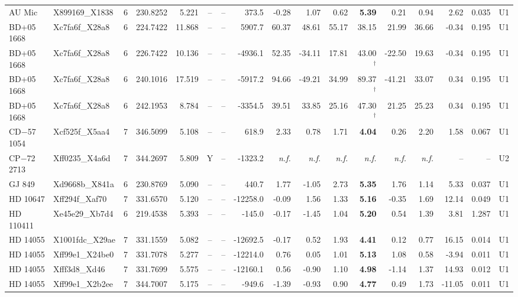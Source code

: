 \begin{tabular}{@{}l@{~}l@{~}c@{~}r@{~}r@{~}c@{~}l@{~}r@{~~}r@{~}r@{~}r@{~~}r@{~}r@{~}r@{~~}r@{~}r@{~}l@{}}
AU Mic & X899169\_X1838 & 6 & 230.8252 & 5.221 & -- & -- & 373.5 & -0.28 & 1.07 & 0.62 & \textbf{5.39} & 0.21 & 0.94 & 2.62 & 0.035 & U1 \\
BD+05 1668 & Xc7fa6f\_X28a8 & 6 & 224.7422 & 11.868 & -- & -- & 5907.7 & 60.37 & 48.61 & 55.17 & 38.15 & 21.99 & 36.66 & -0.34 & 0.195 & U1 \\
BD+05 1668 & Xc7fa6f\_X28a8 & 6 & 226.7422 & 10.136 & -- & -- & -4936.1 & 52.35 & -34.11 & 17.81 & 43.00$^{\dagger}$ & -22.50 & 19.63 & -0.34 & 0.195 & U1 \\
BD+05 1668 & Xc7fa6f\_X28a8 & 6 & 240.1016 & 17.519 & -- & -- & -5917.2 & 94.66 & -49.21 & 34.99 & 89.37$^{\dagger}$ & -41.21 & 33.07 & 0.34 & 0.195 & U1 \\
BD+05 1668 & Xc7fa6f\_X28a8 & 6 & 242.1953 & 8.784 & -- & -- & -3354.5 & 39.51 & 33.85 & 25.16 & 47.30$^{\dagger}$ & 21.25 & 25.23 & 0.34 & 0.195 & U1 \\
CD$-$57 1054 & Xcf525f\_X5aa4 & 7 & 346.5099 & 5.108 & -- & -- & 618.9 & 2.33 & 0.78 & 1.71 & \textbf{4.04} & 0.26 & 2.20 & 1.58 & 0.067 & U1 \\
CP$-$72 2713 & Xff0235\_X4a6d & 7 & 344.2697 & 5.809 & Y & -- & -1323.2 & \emph{n.f.} & \emph{n.f.} & \emph{n.f.} & \emph{n.f.} & \emph{n.f.} & \emph{n.f.} & -- & -- & U2 \\
GJ 849 & Xd9668b\_X841a & 6 & 230.8769 & 5.090 & -- & -- & 440.7 & 1.77 & -1.05 & 2.73 & \textbf{5.35} & 1.76 & 1.14 & 5.33 & 0.037 & U1 \\
HD 10647 & Xff294f\_Xaf70 & 7 & 331.6570 & 5.120 & -- & -- & -12258.0 & -0.09 & 1.56 & 1.33 & \textbf{5.16} & -0.35 & 1.69 & 12.14 & 0.049 & U1 \\
HD 110411 & Xe45e29\_Xb7d4 & 6 & 219.4538 & 5.393 & -- & -- & -145.0 & -0.17 & -1.45 & 1.04 & \textbf{5.20} & 0.54 & 1.39 & 3.81 & 1.287 & U1 \\
HD 14055 & X1001fdc\_X29ae & 7 & 331.1559 & 5.082 & -- & -- & -12692.5 & -0.17 & 0.52 & 1.93 & \textbf{4.41} & 0.12 & 0.77 & 16.15 & 0.014 & U1 \\
HD 14055 & Xff99e1\_X24be0 & 7 & 331.7078 & 5.277 & -- & -- & -12214.0 & 0.76 & 0.05 & 1.01 & \textbf{5.13} & 1.08 & 0.58 & -3.94 & 0.011 & U1 \\
HD 14055 & Xfff3d8\_Xd46 & 7 & 331.7699 & 5.575 & -- & -- & -12160.1 & 0.56 & -0.90 & 1.10 & \textbf{4.98} & -1.14 & 1.37 & 14.93 & 0.012 & U1 \\
HD 14055 & Xff99e1\_X2b2ee & 7 & 344.7007 & 5.175 & -- & -- & -949.6 & -1.39 & -0.93 & 0.90 & \textbf{4.77} & 0.49 & 1.73 & -11.05 & 0.011 & U1 \\

\end{tabular}
